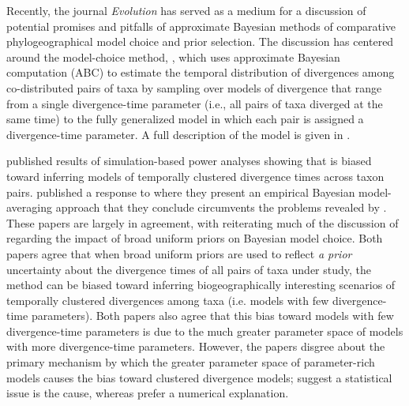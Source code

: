 Recently, the journal \emph{Evolution} has served as a medium for a discussion
of potential promises and pitfalls of approximate Bayesian methods of
comparative phylogeographical model choice and prior selection.
The discussion has centered around the model-choice method, \msb
\citep{Huang2011}, which uses approximate Bayesian computation (ABC) to
estimate the temporal distribution of divergences among co-distributed pairs of
taxa by sampling over models of divergence that range from a single
divergence-time parameter (i.e., all pairs of taxa diverged at the same time)
to the fully generalized model in which each pair is assigned a divergence-time
parameter.
A full description of the model is given in \citet{Oaks2012}.

\citet{Oaks2012} published results of simulation-based power analyses showing
that \msb is biased toward inferring models of temporally clustered divergence
times across taxon pairs.
\citet{Hickerson2013} published a response to \citet{Oaks2012} where they
present an empirical Bayesian model-averaging approach that they conclude
circumvents the problems revealed by \citet{Oaks2012}.
These papers are largely in agreement, with \citet{Hickerson2013} reiterating
much of the discussion of \citet{Oaks2012} regarding the impact of broad
uniform priors on Bayesian model choice.
Both papers agree that when broad uniform priors are used to reflect \emph{a
prior} uncertainty about the divergence times of all pairs of taxa under study,
the method can be biased toward inferring biogeographically interesting
scenarios of temporally clustered divergences among taxa (i.e. models with few
divergence-time parameters).
Both papers also agree that this bias toward models with few divergence-time
parameters is due to the much greater parameter space of models with more
divergence-time parameters.
However, the papers disgree about the primary mechanism by which the greater
parameter space of parameter-rich models causes the bias toward clustered
divergence models;
\citet{Oaks2012} suggest a statistical issue is the cause, whereas
\citep{Hickerson2013} prefer a numerical explanation.

